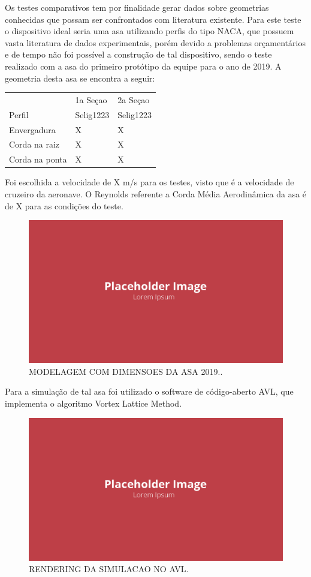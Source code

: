 Os testes comparativos tem por finalidade gerar dados sobre geometrias conhecidas que possam ser confrontados com literatura existente. Para este teste o dispositivo ideal seria uma asa utilizando perfis do tipo NACA, que possuem vasta literatura de dados experimentais, porém devido a problemas orçamentários e de tempo não foi possível a construção de tal dispositivo, sendo o teste realizado com a asa do primeiro protótipo da equipe para o ano de 2019. A geometria desta asa se encontra a seguir:

\begin{table}[]
\centering
\begin{tabular}{lll}
 & 1a Seçao & 2a Seçao \\
Perfil & Selig1223 & Selig1223 \\
Envergadura & X & X \\
Corda na raiz & X & X \\
Corda na ponta & X & X
\end{tabular}
\end{table}

Foi escolhida a velocidade de X m/s para os testes, visto que é a velocidade de cruzeiro da aeronave. O Reynolds referente a Corda Média Aerodinâmica da asa é de X para as condições do teste.

\begin{figure}[!ht]
    \centering
    \includegraphics[width=.8\linewidth]{figuras/placeholder.png}
    \caption{MODELAGEM COM DIMENSOES DA ASA 2019.\cite{autor}.}
    \label{fig:placeholder}
\end{figure}

Para a simulação de tal asa foi utilizado o software de código-aberto AVL, que implementa o algoritmo Vortex Lattice Method.

\begin{figure}[!ht]
    \centering
    \includegraphics[width=.8\linewidth]{figuras/placeholder.png}
    \caption{RENDERING DA SIMULACAO NO AVL\cite{autor}.}
    \label{fig:placeholder}
\end{figure}

